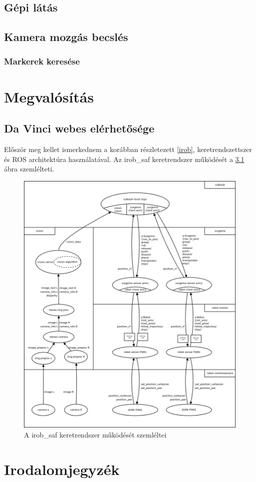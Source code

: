 \documentclass[12pt,a4paper,oneside]{report} %
\begin{document}
\section{Gépi látás}
\section{Kamera mozgás becslés}
\subsection{Markerek keresése}


\chapter{Megvalósítás}
\section{Da Vinci webes elérhetősége}
Először meg kellet ismerkednem a korábban részletezett \ref{irob}, \cite{irobsaf2019} keretrendszettszer és ROS architektúra használatával. Az irob\_saf keretrendszer működését a \ref{fig:irob} ábra szemlélteti.
\begin{figure}
	\label{fig:irob}
\begin{center}
	\includegraphics[width=14cm]{irobArch}
	\caption{A irob\_saf keretrendszer működését szemléltei}
\end{center}
\end{figure}
\newpage
\chapter*{Irodalomjegyzék}
\printbibliography[heading=none]
\newpage
\listoffigures
{}
\end{document}
